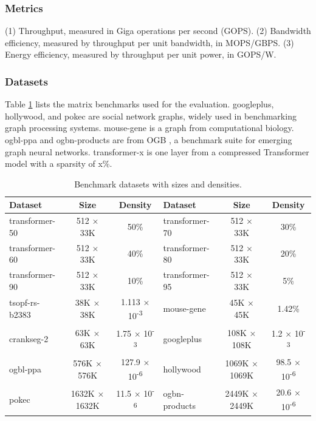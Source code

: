 \documentclass[manuscript,screen,review]{acmart}
\begin{document}
\subsubsection{Metrics}
(1) Throughput, measured in Giga operations per second (GOPS). (2) Bandwidth efficiency, measured by throughput per unit bandwidth, in MOPS/GBPS. (3) Energy efficiency, measured by throughput per unit power, in GOPS/W.

\subsubsection{Datasets}
Table \ref{datasets} lists the matrix benchmarks used for the evaluation.
googleplus, hollywood, and pokec are social network graphs, widely used in benchmarking graph processing systems. mouse-gene is a graph from computational biology. ogbl-ppa and ogbn-products are from OGB \cite{ogb}, a benchmark suite for emerging graph neural networks. transformer-x is one layer from
a compressed Transformer \cite{transformer} model with a sparsity of x\%.


\begin{table}[h!]
	\centering
     \begin{tabular}{|l|c|c||l|c|c|}
		\hline
		\textbf{Dataset} & \textbf{Size} & \textbf{Density} & \textbf{Dataset} & \textbf{Size} & \textbf{Density} \\
		\hline
		transformer-50 & 512 × 33K & 50\% & transformer-70 & 512 × 33K & 30\% \\
		transformer-60 & 512 × 33K & 40\% & transformer-80 & 512 × 33K & 20\% \\
		transformer-90 & 512 × 33K & 10\% & transformer-95 & 512 × 33K & 5\% \\
		tsopf-rs-b2383 & 38K × 38K & 1.113 × 10\textsuperscript{-3} & mouse-gene & 45K × 45K & 1.42\% \\
		crankseg-2 & 63K × 63K & 1.75 × 10\textsuperscript{-3} & googleplus & 108K × 108K & 1.2 × 10\textsuperscript{-3} \\
		ogbl-ppa & 576K × 576K & 127.9 × 10\textsuperscript{-6} & hollywood & 1069K × 1069K & 98.5 × 10\textsuperscript{-6} \\
		pokec & 1632K × 1632K & 11.5 × 10\textsuperscript{-6} & ogbn-products & 2449K × 2449K & 20.6 × 10\textsuperscript{-6} \\
		\hline
	\end{tabular}
	\caption{Benchmark datasets with sizes and densities.}
	\label{datasets}
\end{table}
\end{document}
